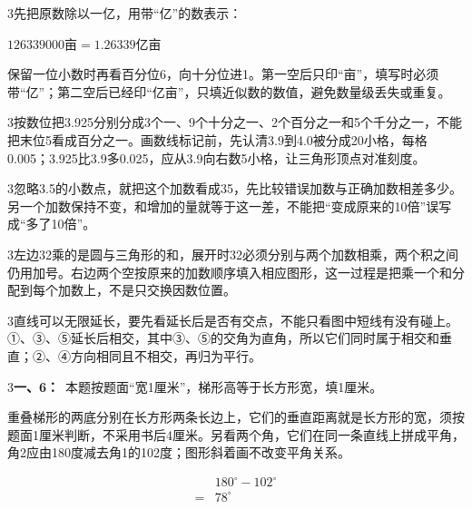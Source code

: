 \documentclass[multi=snippet,border={5bp 20bp 5bp 5bp}]{standalone}
\newenvironment{snippet}[3]{\begin{minipage}{#1bp}\color{answerred}\fontsize{#2}{#3}\selectfont\raggedright}{\end{minipage}}
\begin{document}
\begin{snippet}{505}{11.5}{14}\begin{multicols}{3}\raggedcolumns 先把原数除以一亿，用带“亿”的数表示：\par\noindent\(\displaystyle 126339000\text{亩}=1.26339\text{亿亩}\)\allowbreak \par 保留一位小数时再看百分位6，向十分位进1。第一空后只印“亩”，填写时必须带“亿”；第二空后已经印“亿亩”，只填近似数的数值，避免数量级丢失或重复。\end{multicols}\end{snippet}
\begin{snippet}{505}{11.5}{14}\begin{multicols}{3}\raggedcolumns 按数位把3.925分别分成3个一、9个十分之一、2个百分之一和5个千分之一，不能把末位5看成百分之一。画数线标记前，先认清3.9到4.0被分成20小格，每格0.005；3.925比3.9多0.025，应从3.9向右数5小格，让三角形顶点对准刻度。\end{multicols}\end{snippet}
\begin{snippet}{505}{11.5}{14}\begin{multicols}{3}\raggedcolumns 忽略3.5的小数点，就把这个加数看成35，先比较错误加数与正确加数相差多少。另一个加数保持不变，和增加的量就等于这一差，不能把“变成原来的10倍”误写成“多了10倍”。\end{multicols}\end{snippet}
\begin{snippet}{505}{11.5}{14}\begin{multicols}{3}\raggedcolumns 左边32乘的是圆与三角形的和，展开时32必须分别与两个加数相乘，两个积之间仍用加号。右边两个空按原来的加数顺序填入相应图形，这一过程是把乘一个和分配到每个加数上，不是只交换因数位置。\end{multicols}\end{snippet}
\begin{snippet}{505}{11.5}{14}\begin{multicols}{3}\raggedcolumns 直线可以无限延长，要先看延长后是否有交点，不能只看图中短线有没有碰上。①、③、⑤延长后相交，其中③、⑤的交角为直角，所以它们同时属于相交和垂直；②、④方向相同且不相交，再归为平行。\end{multicols}\end{snippet}
\begin{snippet}{505}{11.5}{14}\begin{multicols}{3}\raggedcolumns \textbf{一、6：}\ 本题按题面“宽1厘米”，梯形高等于长方形宽，填1厘米。\par 重叠梯形的两底分别在长方形两条长边上，它们的垂直距离就是长方形的宽，须按题面1厘米判断，不采用书后4厘米。另看两个角，它们在同一条直线上拼成平角，角2应由180度减去角1的102度；图形斜着画不改变平角关系。\par \[\begin{aligned}&180^\circ-102^\circ\\={}&78^\circ\end{aligned}\]\end{multicols}\end{snippet}
\end{document}
